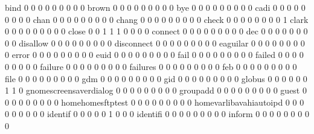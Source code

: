 \documentclass[compress,8pt]{beamer}
\begin{document}
\begin{frame}
\begin{Schunk}
  bind                                       0   0   0   0   0   0   0   0   0
  brown                                      0   0   0   0   0   0   0   0   0
  bye                                        0   0   0   0   0   0   0   0   0
  cadi                                       0   0   0   0   0   0   0   0   0
  chan                                       0   0   0   0   0   0   0   0   0
  chang                                      0   0   0   0   0   0   0   0   0
  check                                      0   0   0   0   0   0   0   0   1
  clark                                      0   0   0   0   0   0   0   0   0
  close                                      0   0   1   1   1   0   0   0   0
  connect                                    0   0   0   0   0   0   0   0   0
  dec                                        0   0   0   0   0   0   0   0   0
  disallow                                   0   0   0   0   0   0   0   0   0
  disconnect                                 0   0   0   0   0   0   0   0   0
  eaguilar                                   0   0   0   0   0   0   0   0   0
  error                                      0   0   0   0   0   0   0   0   0
  euid                                       0   0   0   0   0   0   0   0   0
  fail                                       0   0   0   0   0   0   0   0   0
  failed                                     0   0   0   0   0   0   0   0   0
  failure                                    0   0   0   0   0   0   0   0   0
  failures                                   0   0   0   0   0   0   0   0   0
  feb                                        0   0   0   0   0   0   0   0   0
  file                                       0   0   0   0   0   0   0   0   0
  gdm                                        0   0   0   0   0   0   0   0   0
  gid                                        0   0   0   0   0   0   0   0   0
  globus                                     0   0   0   0   0   0   1   1   0
  gnomescreensaverdialog                     0   0   0   0   0   0   0   0   0
  groupadd                                   0   0   0   0   0   0   0   0   0
  guest                                      0   0   0   0   0   0   0   0   0
  homehomesftptest                           0   0   0   0   0   0   0   0   0
  homevarlibavahiautoipd                     0   0   0   0   0   0   0   0   0
  identif                                    0   0   0   0   0   1   0   0   0
  identifi                                   0   0   0   0   0   0   0   0   0
  inform                                     0   0   0   0   0   0   0   0   0

\end{Schunk}
\end{frame}
\end{document}
